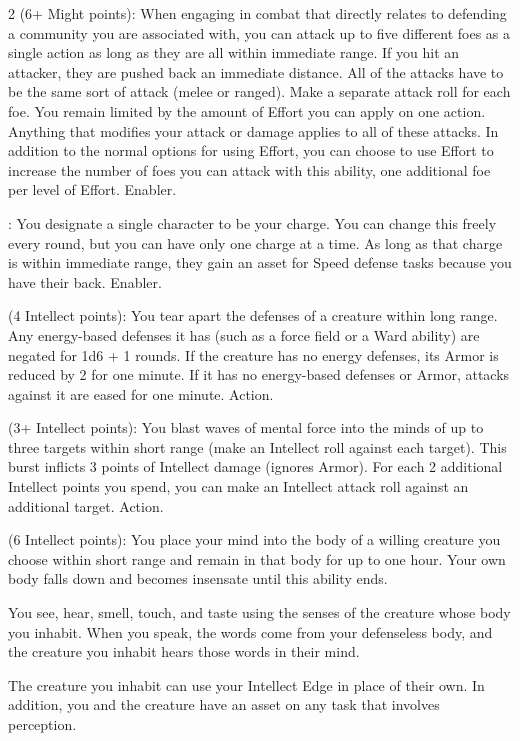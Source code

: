 \begin{multicols}{2}
 (6+ Might points): When engaging in combat that directly relates to defending a community you are associated with, you can attack up to five different foes as a single action as long as they are all within immediate range. If you hit an attacker, they are pushed back an immediate distance. All of the attacks have to be the same sort of attack (melee or ranged). Make a separate attack roll for each foe. You remain limited by the amount of Effort you can apply on one action. Anything that modifies your attack or damage applies to all of these attacks. In addition to the normal options for using Effort, you can choose to use Effort to increase the number of foes you can attack with this ability, one additional foe per level of Effort. Enabler. 
 
: You designate a single character to be your charge. You can change this freely every round, but you can have only one charge at a time. As long as that charge is within immediate range, they gain an asset for Speed defense tasks because you have their back. Enabler. 
 
 (4 Intellect points): You tear apart the defenses of a creature within long range. Any energy-based defenses it has (such as a force field or a Ward ability) are negated for 1d6 + 1 rounds. If the creature has no energy defenses, its Armor is reduced by 2 for one minute. If it has no energy-based defenses or Armor, attacks against it are eased for one minute. Action. 
 
 (3+ Intellect points): You blast waves of mental force into the minds of up to three targets within short range (make an Intellect roll against each target). This burst inflicts 3 points of Intellect damage (ignores Armor). For each 2 additional Intellect points you spend, you can make an Intellect attack roll against an additional target. Action. 
 
 (6 Intellect points): You place your mind into the body of a willing creature you choose within short range and remain in that body for up to one hour. Your own body falls down and becomes insensate until this ability ends. 

You see, hear, smell, touch, and taste using the senses of the creature whose body you inhabit. When you speak, the words come from your defenseless body, and the creature you inhabit hears those words in their mind. 

The creature you inhabit can use your Intellect Edge in place of their own. In addition, you and the creature have an asset on any task that involves perception. 


\end{multicols}
